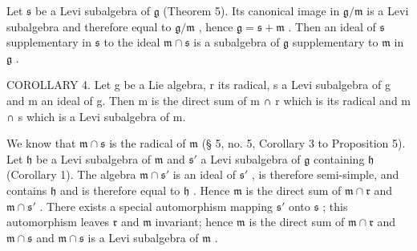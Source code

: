 Let \(\mathfrak{s}\) be a Levi subalgebra of \(\mathfrak{g}\) (Theorem 5). Its canonical image in \(\mathfrak{g}/\mathfrak{m}\) is a Levi subalgebra and therefore equal to \(\mathfrak{g}/\mathfrak{m}\) , hence \(\mathfrak{g} = \mathfrak{s} + \mathfrak{m}\) . Then an ideal of \(\mathfrak{s}\) supplementary in \(\mathfrak{s}\) to the ideal \(\mathfrak{m} \cap \mathfrak{s}\) is a subalgebra of \(\mathfrak{g}\) supplementary to \(\mathfrak{m}\) in \(\mathfrak{g}\) .

COROLLARY 4. Let g be a Lie algebra, r its radical, s a Levi subalgebra of g and m an ideal of g. Then m is the direct sum of m ∩ r which is its radical and m ∩ s which is a Levi subalgebra of m.

We know that \(\mathfrak{m} \cap \mathfrak{s}\) is the radical of \(\mathfrak{m}\) (§ 5, no. 5, Corollary 3 to Proposition 5). Let \(\mathfrak{h}\) be a Levi subalgebra of \(\mathfrak{m}\) and \(\mathfrak{s}'\) a Levi subalgebra of \(\mathfrak{g}\) containing \(\mathfrak{h}\) (Corollary 1). The algebra \(\mathfrak{m} \cap \mathfrak{s}'\) is an ideal of \(\mathfrak{s}'\) , is therefore semi-simple, and contains \(\mathfrak{h}\) and is therefore equal to \(\mathfrak{h}\) . Hence \(\mathfrak{m}\) is the direct sum of \(\mathfrak{m} \cap \mathfrak{r}\) and \(\mathfrak{m} \cap \mathfrak{s}'\) . There exists a special automorphism mapping \(\mathfrak{s}'\) onto \(\mathfrak{s}\) ; this automorphism leaves \(\mathfrak{r}\) and \(\mathfrak{m}\) invariant; hence \(\mathfrak{m}\) is the direct sum of \(\mathfrak{m} \cap \mathfrak{r}\) and \(\mathfrak{m} \cap \mathfrak{s}\) and \(\mathfrak{m} \cap \mathfrak{s}\) is a Levi subalgebra of \(\mathfrak{m}\) .

